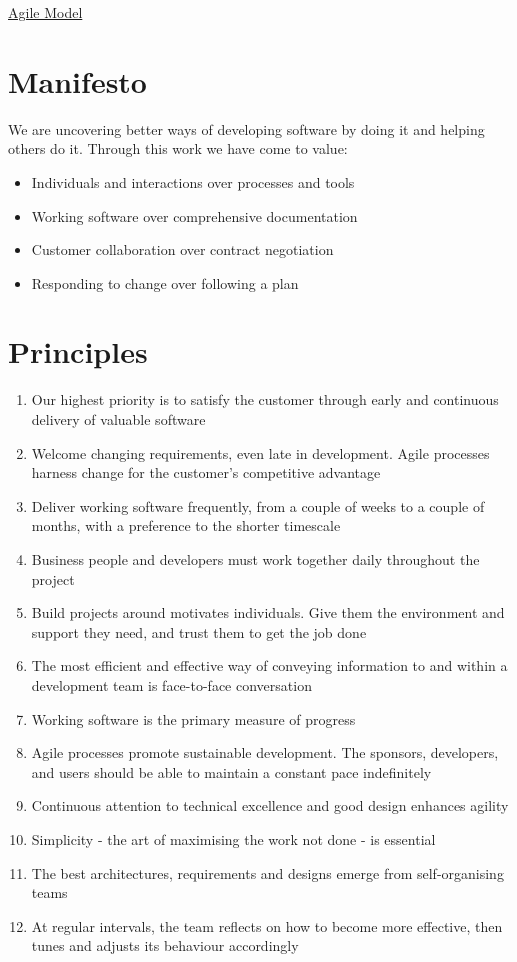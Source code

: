 \documentclass{article}[18pt]
\begin{document}
\begin{center}
\underline{\huge Agile Model}
\end{center}
\section{Manifesto}
We are uncovering better ways of developing software by doing it and helping others do it. Through this work we have come to value:
\begin{itemize}
	\item Individuals and interactions over processes and tools
	\item Working software over comprehensive documentation
	\item Customer collaboration over contract negotiation
	\item Responding to change over following a plan
\end{itemize}
\section{Principles}
\begin{enumerate}
	\item Our highest priority is to satisfy the customer through early and continuous delivery of valuable software
	\item Welcome changing requirements, even late in development. Agile processes harness change for the customer's competitive advantage
	\item Deliver working software frequently, from a couple of weeks to a couple of months, with a preference to the shorter timescale
	\item Business people and developers must work together daily throughout the project
	\item Build projects around motivates individuals. Give them the environment and support they need, and trust them to get the job done
	\item The most efficient and effective way of conveying information to and within a development team is face-to-face conversation
	\item Working software is the primary measure of progress
	\item Agile processes promote sustainable development. The sponsors, developers, and users should be able to maintain a constant pace indefinitely
	\item Continuous attention to technical excellence and good design enhances agility
	\item Simplicity - the art of maximising the work not done - is essential
	\item The best architectures, requirements and designs emerge from self-organising teams
	\item At regular intervals, the team reflects on how to become more effective, then tunes and adjusts its behaviour accordingly
\end{enumerate}
\end{document}
